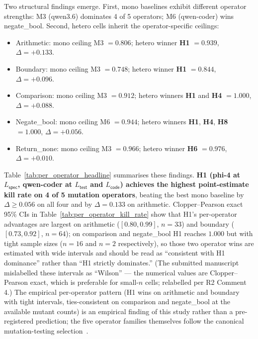 Two structural findings emerge. First, mono baselines exhibit different operator strengths: M3 (qwen3.6) dominates 4 of 5 operators; M6 (qwen-coder) wins negate\_bool. Second, hetero cells inherit the operator-specific ceilings:

\begin{itemize}
  \item Arithmetic: mono ceiling M3 $= 0.806$; hetero winner \textbf{H1} $= 0.939$, $\Delta = +0.133$.
  \item Boundary: mono ceiling M3 $= 0.748$; hetero winner \textbf{H1} $= 0.844$, $\Delta = +0.096$.
  \item Comparison: mono ceiling M3 $= 0.912$; hetero winners \textbf{H1} and \textbf{H4} $= 1.000$, $\Delta = +0.088$.
  \item Negate\_bool: mono ceiling M6 $= 0.944$; hetero winners \textbf{H1}, \textbf{H4}, \textbf{H8} $= 1.000$, $\Delta = +0.056$.
  \item Return\_none: mono ceiling M3 $= 0.966$; hetero winner \textbf{H6} $= 0.976$, $\Delta = +0.010$.
\end{itemize}



Table~\ref{tab:per_operator_headline} summarises these findings. \textbf{H1 (phi-4 at $L_{\textsf{spec}}$, qwen-coder at $L_{\textsf{test}}$ and $L_{\textsf{code}}$) achieves the highest point-estimate kill rate on 4 of 5 mutation operators}, beating the best mono baseline by $\Delta \geq 0.056$ on all four and by $\Delta = 0.133$ on arithmetic. Clopper--Pearson exact 95\% CIs in Table~\ref{tab:per_operator_kill_rate} show that H1's per-operator advantages are largest on arithmetic ($[0.80, 0.99]$, $n = 33$) and boundary ($[0.73, 0.92]$, $n = 64$); on comparison and negate\_bool H1 reaches $1.000$ but with tight sample sizes ($n = 16$ and $n = 2$ respectively), so those two operator wins are estimated with wide intervals and should be read as ``consistent with H1 dominance'' rather than ``H1 strictly dominates.'' (The submitted manuscript mislabelled these intervals as ``Wilson'' --- the numerical values are Clopper--Pearson exact, which is preferable for small-$n$ cells; relabelled per R2 Comment 4.) The empirical per-operator pattern (H1 wins on arithmetic and boundary with tight intervals, ties-consistent on comparison and negate\_bool at the available mutant counts) is an empirical finding of this study rather than a pre-registered prediction; the five operator families themselves follow the canonical mutation-testing selection~\citep{Andrews2005MutationAnalysis, Just2014MutationAnalysis}.

